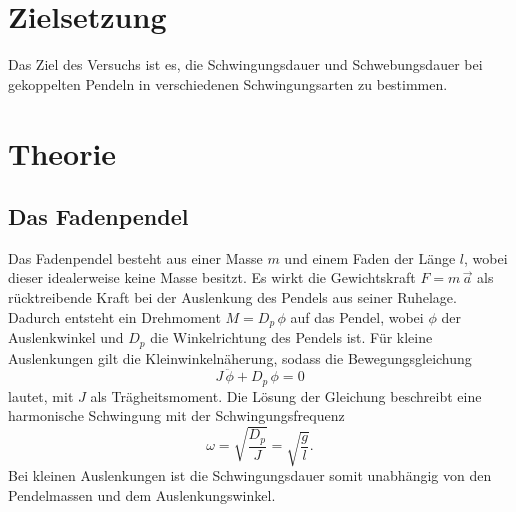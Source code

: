 \section{Zielsetzung}
\label{sec:Zielsetzung}
Das Ziel des Versuchs ist es, die Schwingungsdauer und Schwebungsdauer bei gekoppelten Pendeln in verschiedenen Schwingungsarten zu bestimmen.

\section{Theorie}
\label{sec:Theorie}

\subsection{Das Fadenpendel} %
\label{sub:Fadenpendel}
Das Fadenpendel besteht aus einer Masse $m$ und einem Faden der Länge $l$, wobei dieser idealerweise keine Masse besitzt.
Es wirkt die Gewichtskraft $F=m\,\vec{a}$ als rücktreibende Kraft bei der Auslenkung des Pendels aus seiner Ruhelage.
Dadurch entsteht ein Drehmoment $M=D_p\, \phi$ auf das Pendel, wobei $\phi$ der Auslenkwinkel und $D_p$ die Winkelrichtung des Pendels ist.
Für kleine Auslenkungen gilt die Kleinwinkelnäherung, sodass die Bewegungsgleichung
\begin{equation}
    J \, \ddot{\phi} + D_p \, \phi = 0
\end{equation}
lautet, mit $J$ als Trägheitsmoment.
Die Lösung der Gleichung beschreibt eine harmonische Schwingung mit der Schwingungsfrequenz
\begin{equation}
    \omega = \sqrt{\frac{D_p}{J}} = \sqrt{\frac{g}{l}}.
\end{equation}
Bei kleinen Auslenkungen ist die Schwingungsdauer somit unabhängig von den Pendelmassen und dem Auslenkungswinkel.
 

